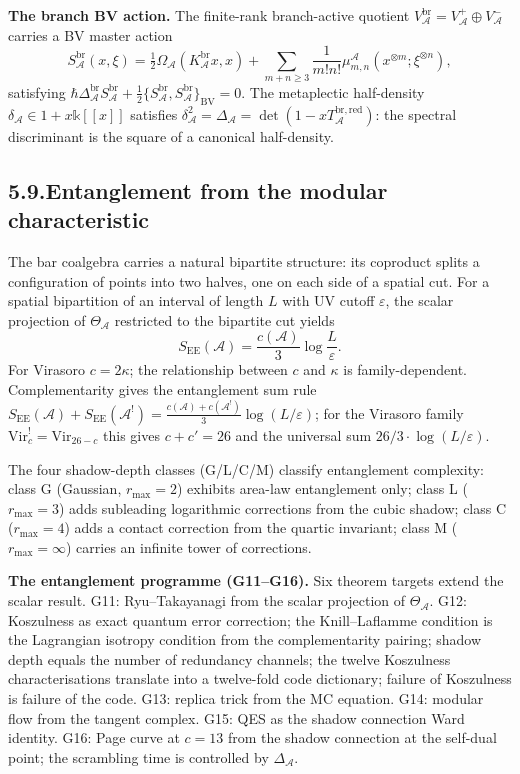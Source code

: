 \documentclass[11pt]{report}
\theoremstyle{definition}
\theoremstyle{remark}
\providecommand{\cA}{\mathcal{A}}
\providecommand{\Bbbk}{\mathbb{k}}
\numberwithin{equation}{section}
\begin{document}
\medskip
\noindent\textbf{The branch BV action.}\enspace
The finite-rank branch-active quotient
$V_\cA^{\mathrm{br}}=V_\cA^+\oplus V_\cA^-$ carries a BV master action
\[
S_\cA^{\mathrm{br}}(x,\xi)=\tfrac12\Omega_\cA(K_\cA^{\mathrm{br}}x,x)+\sum_{m+n\ge 3}\frac{1}{m!n!}\mu_{m,n}^\cA(x^{\otimes m};\xi^{\otimes n}),
\]
satisfying
$\hbar\Delta_\cA^{\mathrm{br}}S_\cA^{\mathrm{br}}+\tfrac12\{S_\cA^{\mathrm{br}},S_\cA^{\mathrm{br}}\}_{\mathrm{BV}}=0$.
The metaplectic half-density $\delta_\cA\in 1+x\Bbbk[[x]]$ satisfies
$\delta_\cA^2=\Delta_\cA=\det(1-xT_\cA^{\mathrm{br,red}})$: the
spectral discriminant is the square of a canonical half-density.

\subsection*{5.9.\enspace Entanglement from the modular characteristic}

The bar coalgebra carries a natural bipartite structure: its coproduct
splits a configuration of points into two halves, one on each side of
a spatial cut. For a spatial bipartition of an interval of length $L$
with UV cutoff $\varepsilon$, the scalar projection of $\Theta_\cA$
restricted to the bipartite cut yields
\[
S_{\mathrm{EE}}(\cA)=\frac{c(\cA)}{3}\log\frac{L}{\varepsilon}.
\]
For Virasoro $c=2\kappa$; the relationship between $c$ and $\kappa$
is family-dependent. Complementarity gives the entanglement sum rule
$S_{\mathrm{EE}}(\cA)+S_{\mathrm{EE}}(\cA^!)=\tfrac{c(\cA)+c(\cA^!)}{3}\log(L/\varepsilon)$;
for the Virasoro family $\mathrm{Vir}_c^!=\mathrm{Vir}_{26-c}$ this
gives $c+c'=26$ and the universal sum $26/3\cdot\log(L/\varepsilon)$.

The four shadow-depth classes (G/L/C/M) classify entanglement
complexity: class G (Gaussian, $r_{\max}=2$) exhibits area-law
entanglement only; class L ($r_{\max}=3$) adds subleading logarithmic
corrections from the cubic shadow; class C ($r_{\max}=4$) adds a
contact correction from the quartic invariant; class M
($r_{\max}=\infty$) carries an infinite tower of corrections.

\medskip
\noindent\textbf{The entanglement programme (G11--G16).}\enspace
Six theorem targets extend the scalar result. G11: Ryu--Takayanagi
from the scalar projection of $\Theta_\cA$. G12: Koszulness as exact
quantum error correction; the Knill--Laflamme condition is the
Lagrangian isotropy condition from the complementarity pairing;
shadow depth equals the number of redundancy channels; the twelve
Koszulness characterisations translate into a twelve-fold code
dictionary; failure of Koszulness is failure of the code. G13:
replica trick from the MC equation. G14: modular flow from the
tangent complex. G15: QES as the shadow connection Ward identity.
G16: Page curve at $c=13$ from the shadow connection at the self-dual
point; the scrambling time is controlled by $\Delta_\cA$.
\end{document}
